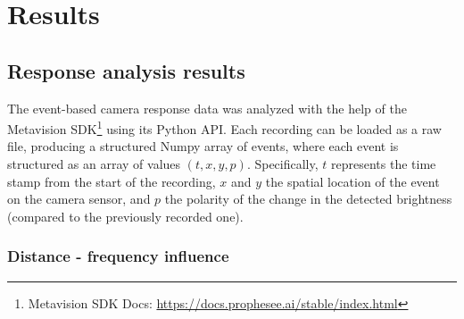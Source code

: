 
\chapter{Results\label{chap:results}}

\section{Response analysis results}

The event-based camera response data was analyzed with the help of the Metavision SDK\footnote{Metavision SDK Docs: \url{https://docs.prophesee.ai/stable/index.html}}
using its Python API. Each recording can be loaded as a raw file, producing a structured Numpy array of events, where each event is structured as an array of values
$(t, x, y, p)$. Specifically, $t$ represents the time stamp from the start of the recording, $x$ and $y$ the spatial location of the event
on the camera sensor, and $p$ the polarity of the change in the detected brightness (compared to the previously recorded one).

\subsection{Distance - frequency influence}

